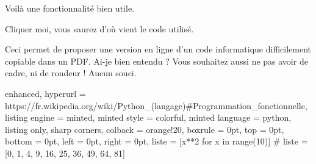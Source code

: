 \documentclass[varwidth, border = 3pt]{standalone}
\begin{document}
Voilà une fonctionnalité bien utile.

%
%
\begin{tcolorbox}[
  enhanced,
  title    = Une boîte pointant vers l'extérieur,
  hyperurl = https://www.latex-project.org/news/2023/03/17/TLC3/,
]
  Cliquer moi, vous saurez d'où vient le code utilisé.
\end{tcolorbox}

Ceci permet de proposer une version en ligne d'un code informatique difficilement copiable dans un PDF. Ai-je bien entendu ? Vous souhaitez aussi ne pas avoir de cadre, ni de rondeur ! Aucun souci.

\begin{tcblisting}{
  enhanced,
  hyperurl = https://fr.wikipedia.org/wiki/Python_(langage)\#Programmation_fonctionnelle,
  listing engine  = minted,
  minted style    = colorful,
  minted language = python,
  listing only,
  sharp corners,
  colback  = orange!20,
  boxrule  = 0pt,
  top      = 0pt,
  bottom   = 0pt,
  left     = 0pt,
  right    = 0pt,
}
liste = [x**2 for x in range(10)]
# liste = [0, 1, 4, 9, 16, 25, 36, 49, 64, 81]
\end{tcblisting}
\end{document}
